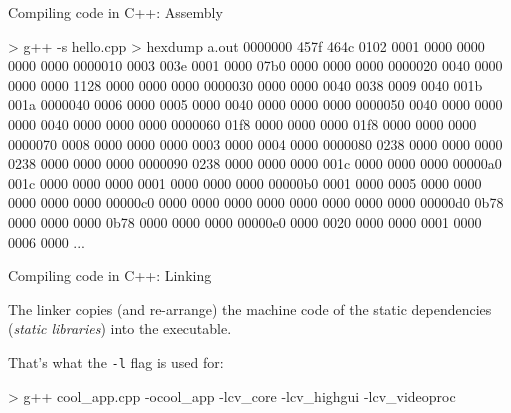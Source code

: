\documentclass[compress]{beamer}
\begin{document}
\begin{frame}[fragile]{Compiling code in C++: Assembly}

\begin{shcode}
> g++ -s hello.cpp
> hexdump a.out
0000000 457f 464c 0102 0001 0000 0000 0000 0000
0000010 0003 003e 0001 0000 07b0 0000 0000 0000
0000020 0040 0000 0000 0000 1128 0000 0000 0000
0000030 0000 0000 0040 0038 0009 0040 001b 001a
0000040 0006 0000 0005 0000 0040 0000 0000 0000
0000050 0040 0000 0000 0000 0040 0000 0000 0000
0000060 01f8 0000 0000 0000 01f8 0000 0000 0000
0000070 0008 0000 0000 0000 0003 0000 0004 0000
0000080 0238 0000 0000 0000 0238 0000 0000 0000
0000090 0238 0000 0000 0000 001c 0000 0000 0000
00000a0 001c 0000 0000 0000 0001 0000 0000 0000
00000b0 0001 0000 0005 0000 0000 0000 0000 0000
00000c0 0000 0000 0000 0000 0000 0000 0000 0000
00000d0 0b78 0000 0000 0000 0b78 0000 0000 0000
00000e0 0000 0020 0000 0000 0001 0000 0006 0000
...
\end{shcode}
\end{frame}

\begin{frame}[fragile]{Compiling code in C++: Linking}

The linker copies (and re-arrange) the machine code of the static dependencies
(\emph{static libraries}) into the executable.

That's what the \texttt{-l} flag is used for:

\begin{shcode}
> g++ cool_app.cpp -ocool_app -lcv_core -lcv_highgui -lcv_videoproc
\end{shcode}

\end{frame}

%
%
%
%
%
%
\end{document}
